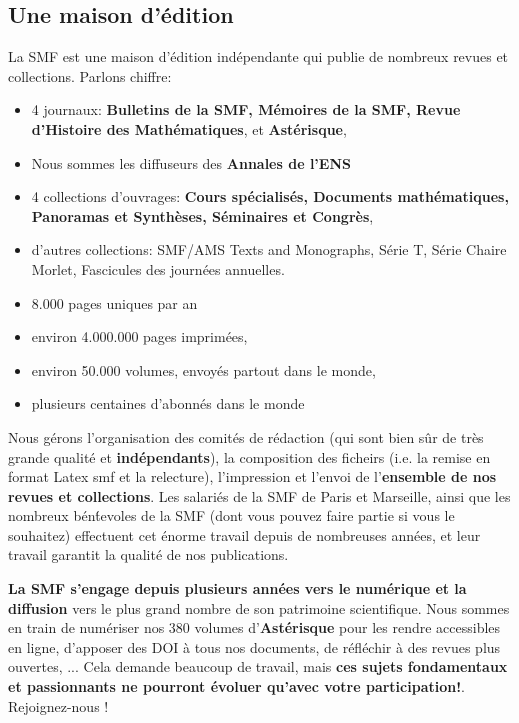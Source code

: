 \subsection*{Une maison d'\'{e}dition}
La SMF est une maison d'\'edition ind\'ependante qui publie de nombreux revues et collections. Parlons chiffre:\begin{itemize}
\item
4 journaux: {\bf Bulletins de la SMF, M\'emoires de la SMF, Revue d'Histoire des Math\'ematiques}, et {\bf Ast\'erisque},
\item
Nous sommes les diffuseurs des {\bf Annales de l'ENS}
\item
4 collections d'ouvrages: {\bf Cours sp\'ecialis\'es,
Documents math\'ematiques, Panoramas et Synth\`eses, S\'eminaires et Congr\`es},

\item
d'autres collections: SMF/AMS Texts and Monographs, S\'erie T, S\'erie Chaire Morlet, Fascicules des journ\'ees annuelles.
\item
 8.000 pages uniques par an

\item
 environ 4.000.000 pages imprim\'ees, 
 \item
 environ 50.000 volumes, envoy\'es partout dans le monde,

\item
 plusieurs centaines d'abonn\'es dans le monde
\end{itemize}

Nous g\'erons l'organisation des comit\'es de r\'edaction (qui sont bien s\^ur de tr\`es grande qualit\'e et {\bf ind\'ependants}), la composition des ficheirs (i.e. la remise en format Latex smf et la relecture), l'impression et l'envoi de l'{\bf ensemble de nos revues et collections}. Les salari\'es de la SMF de Paris et Marseille, ainsi que les nombreux b\'en\'tevoles de la SMF (dont vous pouvez faire partie si vous le souhaitez) effectuent cet \'enorme travail depuis de nombreuses ann\'ees, et leur travail garantit la qualit\'e de nos publications.



{\bf La SMF s'engage depuis plusieurs ann\'ees vers le num\'erique et la diffusion} vers le plus grand nombre de son patrimoine scientifique. Nous sommes en train de num\'eriser nos 380 volumes d'{\bf Ast\'erisque} pour les rendre accessibles en ligne,  d'apposer des DOI \`a tous nos documents, de r\'efl\'echir \`a des revues plus \og ouvertes\fg{}, ... Cela demande beaucoup de travail, mais {\bf ces sujets fondamentaux et passionnants ne pourront \'evoluer qu'avec votre participation!}. Rejoignez-nous ! 

